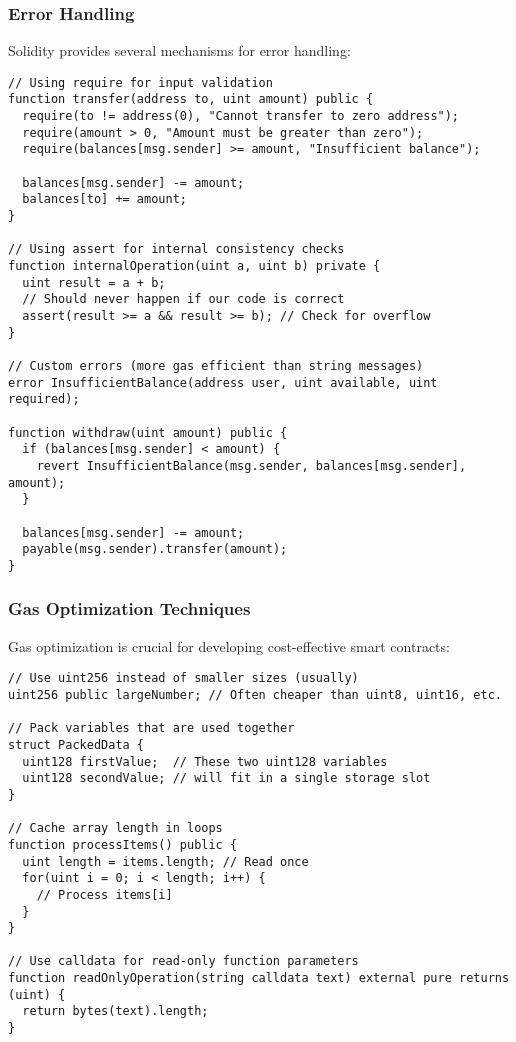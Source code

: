 \documentclass[12pt]{article}
\begin{document}
\noindent
\begin{minipage}[c]{\textwidth}
  \subsubsection*{Error Handling}
  Solidity provides several mechanisms for error handling:

  \begin{lstlisting}[language=Solidity]
// Using require for input validation
function transfer(address to, uint amount) public {
  require(to != address(0), "Cannot transfer to zero address");
  require(amount > 0, "Amount must be greater than zero");
  require(balances[msg.sender] >= amount, "Insufficient balance");
  
  balances[msg.sender] -= amount;
  balances[to] += amount;
}

// Using assert for internal consistency checks
function internalOperation(uint a, uint b) private {
  uint result = a + b;
  // Should never happen if our code is correct
  assert(result >= a && result >= b); // Check for overflow
}

// Custom errors (more gas efficient than string messages)
error InsufficientBalance(address user, uint available, uint required);

function withdraw(uint amount) public {
  if (balances[msg.sender] < amount) {
    revert InsufficientBalance(msg.sender, balances[msg.sender], amount);
  }
  
  balances[msg.sender] -= amount;
  payable(msg.sender).transfer(amount);
}
\end{lstlisting}
\end{minipage}

\subsubsection*{Gas Optimization Techniques}
Gas optimization is crucial for developing cost-effective smart contracts:

\noindent
\begin{minipage}[c]{\textwidth}
  \begin{lstlisting}[language=Solidity]
// Use uint256 instead of smaller sizes (usually)
uint256 public largeNumber; // Often cheaper than uint8, uint16, etc.

// Pack variables that are used together
struct PackedData {
  uint128 firstValue;  // These two uint128 variables
  uint128 secondValue; // will fit in a single storage slot
}

// Cache array length in loops
function processItems() public {
  uint length = items.length; // Read once
  for(uint i = 0; i < length; i++) {
    // Process items[i]
  }
}

// Use calldata for read-only function parameters
function readOnlyOperation(string calldata text) external pure returns (uint) {
  return bytes(text).length;
}
\end{lstlisting}
\end{minipage}
\end{document}
